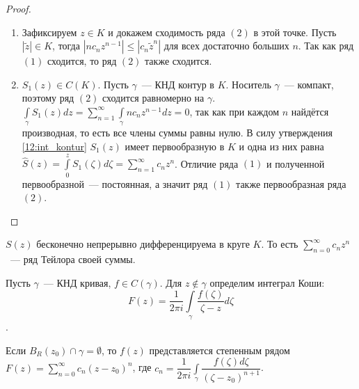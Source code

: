 \begin{proof}
    \begin{enumerate}[wide=5pt, label=\arabic*., itemsep=0ex]
        \item Зафиксируем \(z \in K\) и докажем сходимость ряда \((2)\) в этой точке. Пусть 
        \(|\tilde{z}| \in K\), тогда \(|n c_n z^{n-1}| \le |c_n \tilde{z}^n|\) для всех достаточно 
        больших \(n\). Так как ряд \((1)\) сходится, то ряд \((2)\) также сходится.
        \item \(S_1(z) \in C(K)\). Пусть \(\gamma\)~--- КНД контур в \(K\). Носитель \(\gamma\)~---
        компакт, поэтому ряд \((2)\) сходится равномерно на \(\gamma\). \(\int\limits_\gamma S_1(z)
        dz = \sum\limits_{n = 1}^\infty \int\limits_\gamma n c_n z^{n-1} dz = 0\), так как при 
        каждом \(n\) найдётся производная, то есть все члены суммы равны нулю. В силу утверждения
        \ref{12:int_kontur} \(S_1(z)\) имеет первообразную в \(K\) и одна из них равна \(\hat{S}(z)
        = \int\limits_0^z{S_1(\zeta) d\zeta} = \sum\limits_{n=1}^\infty c_n z^n\). Отличие ряда 
        \((1)\) и полученной первообразной~--- постоянная, а значит ряд \((1)\) также первообразная
        ряда \((2)\).
    \end{enumerate}
\end{proof}

\begin{corollary}
    \(S(z)\) бесконечно непрерывно дифференцируема в круге \(K\). То есть \(\sum\limits_{n=0}^\infty
    {c_n z^n}\)~--- ряд Тейлора своей суммы.
\end{corollary}



Пусть \(\gamma\)~--- КНД кривая, \(f \in C(\gamma)\). Для \(z \notin \gamma\) определим интеграл
Коши: \[F(z) = \dfrac{1}{2 \pi i} \int\limits_\gamma \dfrac{f(\zeta)}{\zeta - z} d\zeta \tag{1}\].

\begin{statement}
    Если \(B_R (z_0) \cap \gamma = \emptyset\), то \(f(z)\) представляется степенным рядом \(F(z) =
    \sum\limits_{n=0}^\infty{c_n(z-z_0)^n}\), где \(c_n = \dfrac{1}{2 \pi i} \int\limits_\gamma
    \dfrac{f(\zeta) d\zeta}{(\zeta - z_0)^{n+1}}\).
\end{statement}